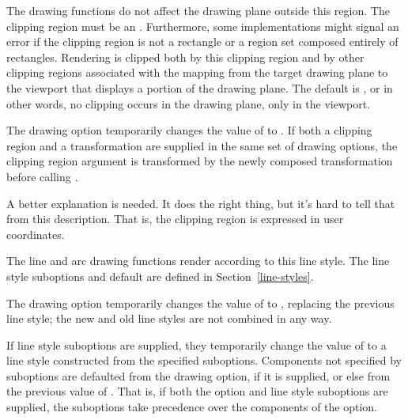 
The drawing functions do not affect the drawing plane outside this region.  The
clipping region must be an .  Furthermore, some implementations might
signal an error if the clipping region is not a rectangle or a region set
composed entirely of rectangles.  Rendering is clipped both by this clipping
region and by other clipping regions associated with the mapping from the target
drawing plane to the viewport that displays a portion of the drawing plane.  The
default is , or in other words, no clipping occurs in the
drawing plane, only in the viewport.

The   drawing option temporarily changes the
value of  to .  If both a clipping region and a
transformation are supplied in the same set of drawing options, the clipping
region argument is transformed by the newly composed transformation before
calling .

 {A better explanation is needed.  It does the right thing, but
it's hard to tell that from this description.  That is, the clipping region is
expressed in user coordinates.}



The line and arc drawing functions render according to this line style.  The
line style suboptions and default are defined in Section~\ref{line-styles}.

The   drawing option temporarily changes the value of
 to , replacing the previous line
style; the new and old line styles are not combined in any way.

If line style suboptions are supplied, they temporarily change the value of
 to a line style constructed from the
specified suboptions.  Components not specified by suboptions are defaulted from
the  drawing option, if it is supplied, or else from the
previous value of .  That is, if both the
 option and line style suboptions are supplied, the suboptions
take precedence over the components of the  option.



